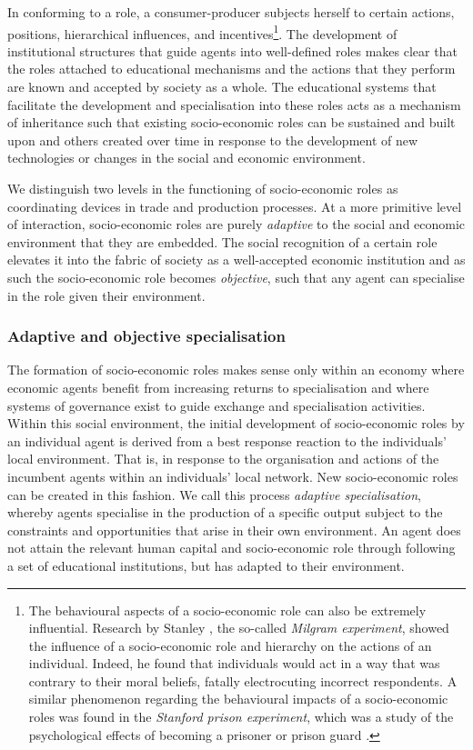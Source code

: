 In conforming to a role, a consumer-producer subjects herself to certain actions, positions, hierarchical influences, and incentives\footnote{The behavioural aspects of a socio-economic role can also be extremely influential. Research by Stanley \citet{Milgram1963}, the so-called \emph{Milgram experiment}, showed the influence of a socio-economic role and hierarchy on the actions of an individual. Indeed, he found that individuals would act in a way that was contrary to their moral beliefs, fatally electrocuting incorrect respondents. A similar phenomenon regarding the behavioural impacts of a socio-economic roles was found in the \emph{Stanford prison experiment}, which was a study of the psychological effects of becoming a prisoner or prison guard \citep{Zimbardo1971}.}. The development of institutional structures that guide agents into well-defined roles makes clear that the roles attached to educational mechanisms and the actions that they perform are known and accepted by society as a whole. The educational systems that facilitate the development and specialisation into these roles acts as a mechanism of inheritance such that existing socio-economic roles can be sustained and built upon and others created over time in response to the development of new technologies or changes in the social and economic environment.

We distinguish two levels in the functioning of socio-economic roles as coordinating devices in trade and production processes. At a more primitive level of interaction, socio-economic roles are purely \emph{adaptive} to the social and economic environment that they are embedded. The social recognition of a certain role elevates it into the fabric of society as a well-accepted economic institution and as such the socio-economic role becomes \emph{objective}, such that any agent can specialise in the role given their environment.

\subsubsection{Adaptive and objective specialisation}

The formation of socio-economic roles makes sense only within an economy where economic agents benefit from increasing returns to specialisation and where systems of governance exist to guide exchange and specialisation activities. Within this social environment, the initial development of socio-economic roles by an individual agent is derived from a best response reaction to the individuals' local environment. That is, in response to the organisation and actions of the incumbent agents within an individuals' local network. New socio-economic roles can be created in this fashion. We call this process \emph{adaptive specialisation}, whereby agents specialise in the production of a specific output subject to the constraints and opportunities that arise in their own environment. An agent does not attain the relevant human capital and socio-economic role through following a set of educational institutions, but has adapted to their environment.

